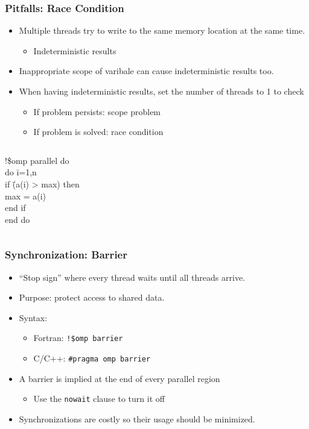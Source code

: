 \documentclass[slidestop,mathserif,compress,xcolor=svgnames]{beamer}
\newenvironment{eblock}[0]
{
\begin{beamerboxesrounded}[upper=uppercol2,lower=lowercol2,shadow=true]}
{\end{beamerboxesrounded}}
\begin{document}
\begin{frame}
  \frametitle{\small Pitfalls: Race Condition}
  \begin{itemize}
    \item Multiple threads try to write to the same memory location at the same time.
    \begin{itemize}
      \item Indeterministic results
    \end{itemize}
    \item Inappropriate scope of varibale can cause indeterministic results too.
    \item When having indeterministic results, set the number of threads to 1 to check
    \begin{itemize}
      \item If problem persists: scope problem
      \item If problem is solved: race condition
    \end{itemize}
  \end{itemize}
  \begin{columns}
    \column{4cm}
    \begin{eblock}{}
      \begin{tabbing}
        !\$omp parallel do \\
        do \=i=1,n \\
        \> if \=(a(i) > max) then \\
        \>\> max = a(i) \\
        \> end if \\
        end do
      \end{tabbing}
    \end{eblock}
  \end{columns}
\end{frame}

\begin{frame}
  \frametitle{\small Synchronization: Barrier}
  \begin{itemize}
    \item ``Stop sign'' where every thread waits until all threads arrive.
    \item Purpose: protect access to shared data.
    \item Syntax:
    \begin{itemize}
      \item Fortran: \texttt{!\$omp barrier}
      \item C/C++: \texttt{\#pragma omp barrier}
    \end{itemize}
    \item A barrier is implied at the end of every parallel region
    \begin{itemize}
      \item Use the \texttt{nowait} clause to turn it off
    \end{itemize}
    \item Synchronizations are costly so their usage should be minimized.
  \end{itemize}
\end{frame}
\end{document}
